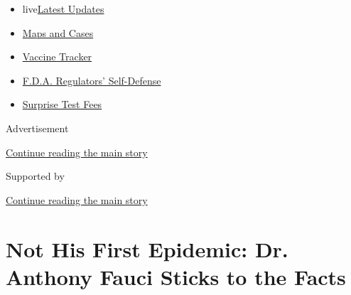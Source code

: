\begin{itemize}
\tightlist
\item
  live\href{https://www.nytimes3xbfgragh.onion/2020/09/12/world/covid-19-coronavirus.html?name=styln-coronavirus-national\&region=TOP_BANNER\&block=storyline_menu_recirc\&action=click\&pgtype=Article\&impression_id=ccd65241-f52e-11ea-b984-0101ae12a377\&variant=undefined}{Latest
  Updates}
\item
  \href{https://www.nytimes3xbfgragh.onion/interactive/2020/us/coronavirus-us-cases.html?name=styln-coronavirus-national\&region=TOP_BANNER\&block=storyline_menu_recirc\&action=click\&pgtype=Article\&impression_id=ccd65242-f52e-11ea-b984-0101ae12a377\&variant=undefined}{Maps
  and Cases}
\item
  \href{https://www.nytimes3xbfgragh.onion/interactive/2020/science/coronavirus-vaccine-tracker.html?name=styln-coronavirus-national\&region=TOP_BANNER\&block=storyline_menu_recirc\&action=click\&pgtype=Article\&impression_id=ccd65243-f52e-11ea-b984-0101ae12a377\&variant=undefined}{Vaccine
  Tracker}
\item
  \href{https://www.nytimes3xbfgragh.onion/2020/09/10/us/politics/fda-coronavirus-vaccine.html?name=styln-coronavirus-national\&region=TOP_BANNER\&block=storyline_menu_recirc\&action=click\&pgtype=Article\&impression_id=ccd65244-f52e-11ea-b984-0101ae12a377\&variant=undefined}{F.D.A.
  Regulators' Self-Defense}
\item
  \href{https://www.nytimes3xbfgragh.onion/2020/09/09/upshot/coronavirus-surprise-test-fees.html?name=styln-coronavirus-national\&region=TOP_BANNER\&block=storyline_menu_recirc\&action=click\&pgtype=Article\&impression_id=ccd67950-f52e-11ea-b984-0101ae12a377\&variant=undefined}{Surprise
  Test Fees}
\end{itemize}

Advertisement

\protect\hyperlink{after-top}{Continue reading the main story}

Supported by

\protect\hyperlink{after-sponsor}{Continue reading the main story}

\hypertarget{not-his-first-epidemic-dr-anthony-fauci-sticks-to-the-facts}{%
\section{Not His First Epidemic: Dr. Anthony Fauci Sticks to the
Facts}\label{not-his-first-epidemic-dr-anthony-fauci-sticks-to-the-facts}}

